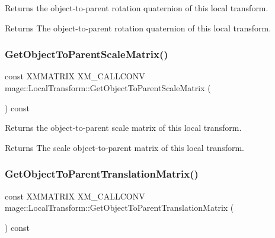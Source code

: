 Returns the object-\/to-\/parent rotation quaternion of this local transform.

\begin{DoxyReturn}{Returns}
The object-\/to-\/parent rotation quaternion of this local transform. 
\end{DoxyReturn}
\hypertarget{classmage_1_1_local_transform_acd4fda032325f52cb668fc4733c6bc04}{}\label{classmage_1_1_local_transform_acd4fda032325f52cb668fc4733c6bc04} 
\subsubsection{\texorpdfstring{Get\+Object\+To\+Parent\+Scale\+Matrix()}{GetObjectToParentScaleMatrix()}}
{\footnotesize\ttfamily const X\+M\+M\+A\+T\+R\+IX X\+M\+\_\+\+C\+A\+L\+L\+C\+O\+NV mage\+::\+Local\+Transform\+::\+Get\+Object\+To\+Parent\+Scale\+Matrix (\begin{DoxyParamCaption}{ }\end{DoxyParamCaption}) const\hspace{0.3cm}{\ttfamily [noexcept]}}

Returns the object-\/to-\/parent scale matrix of this local transform.

\begin{DoxyReturn}{Returns}
The scale object-\/to-\/parent matrix of this local transform. 
\end{DoxyReturn}
\hypertarget{classmage_1_1_local_transform_a417c97411f3214119a1e7298de4b1631}{}\label{classmage_1_1_local_transform_a417c97411f3214119a1e7298de4b1631} 
\subsubsection{\texorpdfstring{Get\+Object\+To\+Parent\+Translation\+Matrix()}{GetObjectToParentTranslationMatrix()}}
{\footnotesize\ttfamily const X\+M\+M\+A\+T\+R\+IX X\+M\+\_\+\+C\+A\+L\+L\+C\+O\+NV mage\+::\+Local\+Transform\+::\+Get\+Object\+To\+Parent\+Translation\+Matrix (\begin{DoxyParamCaption}{ }\end{DoxyParamCaption}) const\hspace{0.3cm}{\ttfamily [noexcept]}}

